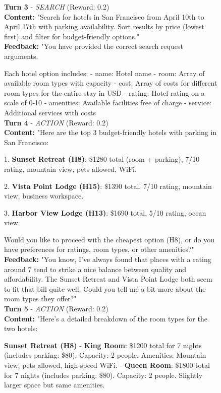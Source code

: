 \begin{figure}[t]
{\begin{tcolorbox}[colback=green!5!white, colframe=green!75!black, 
title=Good Example - Qwen3-32B (Travel-444), boxrule=0.3mm, width=\textwidth, arc=3mm, auto outer arc=true]
\textbf{Turn 3} - \textit{SEARCH} (Reward: \textcolor{deepgreen}{0.2})\\
\textbf{Content:} "Search for hotels in San Francisco from April 10th to April 17th with parking availability. Sort results by price (lowest first) and filter for budget-friendly options."\\
\textbf{Feedback:} "You have provided the correct search request arguments.

Each hotel option includes:
- name: Hotel name
- room: Array of available room types with capacity
- cost: Array of costs for different room types for the entire stay in USD
- rating: Hotel rating on a scale of 0-10
- amenities: Available facilities free of charge
- service: Additional services with costs\\


\textbf{Turn 4} - \textit{ACTION} (Reward: \textcolor{deepgreen}{0.2})\\
\textbf{Content:} "Here are the top 3 budget-friendly hotels with parking in San Francisco:

1. \textbf{Sunset Retreat (H8)}: \$1280 total (room + parking), 7/10 rating, mountain view, pets allowed, WiFi.

2. \textbf{Vista Point Lodge (H15)}: \$1390 total, 7/10 rating, mountain view, business workspace.

3. \textbf{Harbor View Lodge (H13)}: \$1690 total, 5/10 rating, ocean view.

Would you like to proceed with the cheapest option (H8), or do you have preferences for ratings, room types, or other amenities?"\\
\textbf{Feedback:} "You know, I've always found that places with a rating around 7 tend to strike a nice balance between quality and affordability. The Sunset Retreat and Vista Point Lodge both seem to fit that bill quite well. Could you tell me a bit more about the room types they offer?"\\

\textbf{Turn 5} - \textit{ACTION} (Reward: \textcolor{deepgreen}{0.2})\\
\textbf{Content:} "Here’s a detailed breakdown of the room types for the two hotels:

\textbf{Sunset Retreat (H8)}
- \textbf{King Room}: \$1200 total for 7 nights (includes parking: \$80). Capacity: 2 people. Amenities: Mountain view, pets allowed, high-speed WiFi.
- \textbf{Queen Room}: \$1800 total for 7 nights (includes parking: \$80). Capacity: 2 people. Slightly larger space but same amenities.


\end{tcolorbox}}
\end{figure}
